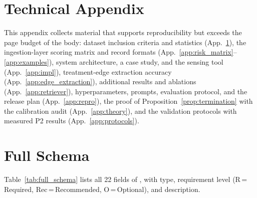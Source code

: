 
\clearpage %

\setcounter{table}{0}
\setcounter{figure}{0}
\renewcommand{\thetable}{A.\arabic{table}}
\renewcommand{\thefigure}{A.\arabic{figure}}

\section*{Technical Appendix}

This appendix collects material that supports reproducibility but exceeds the page budget of the body: dataset inclusion criteria and statistics (App.~\ref{app:full_schema}), the ingestion-layer scoring matrix and record formats (App.~\ref{app:risk_matrix}--\ref{app:examples}), system architecture, a case study, and the sensing tool (App.~\ref{app:impl}), treatment-edge extraction accuracy (App.~\ref{app:edge_extraction}), additional results and ablations (App.~\ref{app:retriever}), hyperparameters, prompts, evaluation protocol, and the release plan (App.~\ref{app:repro}), the proof of Proposition~\ref{prop:termination} with the calibration audit (App.~\ref{app:theory}), and the validation protocols with measured P2 results (App.~\ref{app:protocols}).

\section{Full \schemafile{} Schema}
\label{app:full_schema}

Table~\ref{tab:full_schema} lists all 22 fields of \schemafile{}, with type, requirement level (R\,=\,Required, Rec\,=\,Recommended, O\,=\,Optional), and description.

